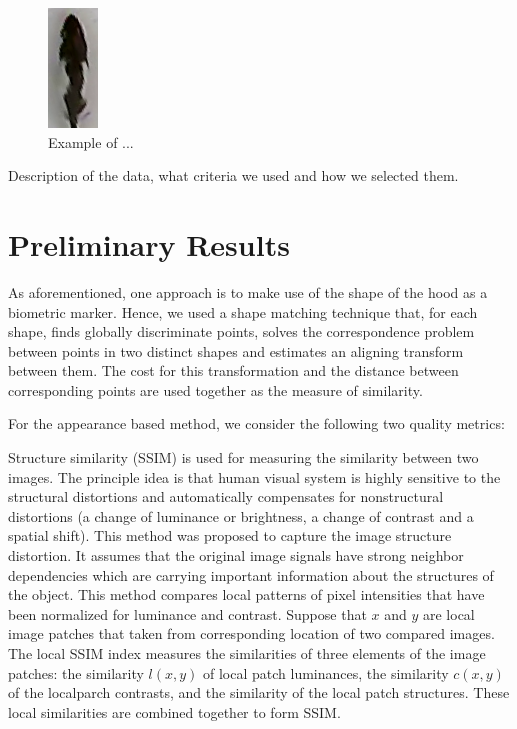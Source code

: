 \documentclass[conference,10pt,times,letter]{IEEEtran}
\newlength{\frameHeight}
\begin{document}
\begin{figure}[h]
\includegraphics[height=\frameHeight]{dataset/5.png}
\caption{Example of ...}
\end{figure}

Description of the data, what criteria we used and how we selected them.

\section{Preliminary Results}
\label{sec:results}


As aforementioned, one approach is to make use of the shape of the hood as a biometric marker. Hence, we used a shape matching technique \cite{belongie2002shape} that, for each shape, finds globally discriminate points, solves the correspondence problem between points in two distinct shapes and estimates an aligning transform between them. The cost for this transformation and the distance between corresponding points are used together as the measure of similarity.

For the appearance based method, we consider the following two quality metrics:

Structure similarity (SSIM)\cite{wang2004image} is used for measuring the similarity between two images. The principle idea is that human visual system is highly sensitive to the structural distortions and automatically compensates for nonstructural distortions (a change of luminance or brightness, a change of contrast and a spatial shift). This method was proposed to capture the image structure distortion. 
It assumes that the original image signals have strong neighbor dependencies which are carrying important information about the structures of the object. This method compares local patterns of pixel intensities that have been normalized for luminance and contrast. Suppose that $x$ and $y$ are local image patches that taken from corresponding location of two compared images. The local SSIM index measures the similarities of three elements of the image patches: the similarity $l(x,y)$ of local patch luminances, the similarity $c(x,y)$ of the localparch contrasts, and the similarity of the local patch structures. These local similarities are combined together to form SSIM. 
\end{document}
